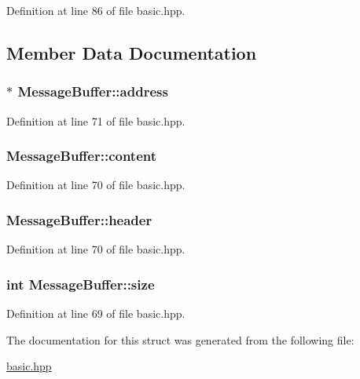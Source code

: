 Definition at line 86 of file basic.hpp.

\subsection{Member Data Documentation}
\hypertarget{struct_message_buffer_a3904730ac874f087e0d523ec5583a786}{
\subsubsection[{address}]{$\ast$ {\bf MessageBuffer::address}}}
\label{struct_message_buffer_a3904730ac874f087e0d523ec5583a786}


Definition at line 71 of file basic.hpp.\hypertarget{struct_message_buffer_aacb71926287db561ee1be822b3c22c29}{
\subsubsection[{content}]{ {\bf MessageBuffer::content}}}
\label{struct_message_buffer_aacb71926287db561ee1be822b3c22c29}


Definition at line 70 of file basic.hpp.\hypertarget{struct_message_buffer_a8980cf66ff82d8e41272c71b7eed95cf}{
\subsubsection[{header}]{ {\bf MessageBuffer::header}}}
\label{struct_message_buffer_a8980cf66ff82d8e41272c71b7eed95cf}


Definition at line 70 of file basic.hpp.\hypertarget{struct_message_buffer_a312b0b881f953e7297e09babf07ad310}{
\subsubsection[{size}]{\setlength{\rightskip}{0pt plus 5cm}int {\bf MessageBuffer::size}}}
\label{struct_message_buffer_a312b0b881f953e7297e09babf07ad310}


Definition at line 69 of file basic.hpp.

The documentation for this struct was generated from the following file:\begin{DoxyCompactItemize}
\item 
\hyperlink{basic_8hpp}{basic.hpp}\end{DoxyCompactItemize}
